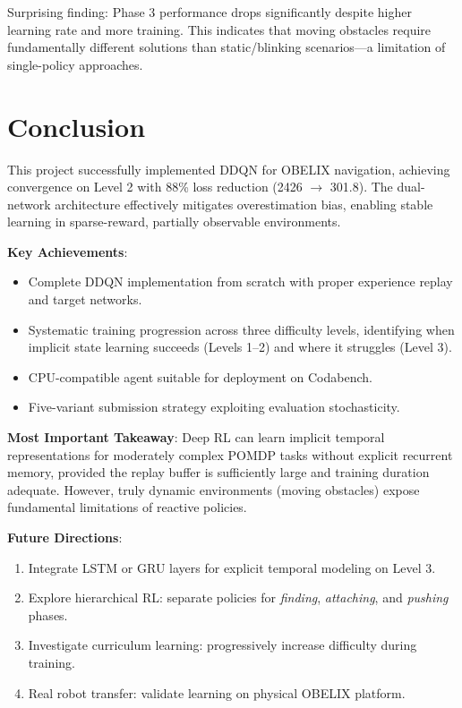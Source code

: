 \documentclass[12pt,a4paper]{article}
\begin{document}
Surprising finding: Phase 3 performance drops significantly despite higher learning rate and more training. This indicates that moving obstacles require fundamentally different solutions than static/blinking scenarios---a limitation of single-policy approaches.

\section{Conclusion}

This project successfully implemented DDQN for OBELIX navigation, achieving convergence on Level 2 with 88\% loss reduction (2426 $\to$ 301.8). The dual-network architecture effectively mitigates overestimation bias, enabling stable learning in sparse-reward, partially observable environments.

\textbf{Key Achievements}:
\begin{itemize}
    \item Complete DDQN implementation from scratch with proper experience replay and target networks.
    \item Systematic training progression across three difficulty levels, identifying when implicit state learning succeeds (Levels 1--2) and where it struggles (Level 3).
    \item CPU-compatible agent suitable for deployment on Codabench.
    \item Five-variant submission strategy exploiting evaluation stochasticity.
\end{itemize}

\textbf{Most Important Takeaway}: Deep RL can learn implicit temporal representations for moderately complex POMDP tasks without explicit recurrent memory, provided the replay buffer is sufficiently large and training duration adequate. However, truly dynamic environments (moving obstacles) expose fundamental limitations of reactive policies.

\textbf{Future Directions}:
\begin{enumerate}
    \item Integrate LSTM or GRU layers for explicit temporal modeling on Level 3.
    \item Explore hierarchical RL: separate policies for \textit{finding}, \textit{attaching}, and \textit{pushing} phases.
    \item Investigate curriculum learning: progressively increase difficulty during training.
    \item Real robot transfer: validate learning on physical OBELIX platform.
\end{enumerate}
\end{document}
